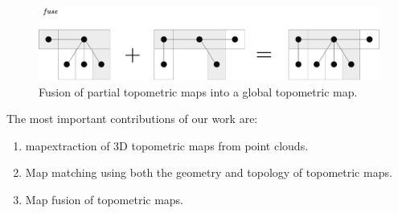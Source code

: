 \begin{figure}[h]
    \centering
    \includegraphics*[width=.9\textwidth]{./fig/overview_diagrams-Page-1.drawio.pdf}
    \caption{Fusion of partial topometric maps into a global topometric map.}
    \label{fig:fuse_intro}
\end{figure}

The most important contributions of our work are:

\begin{enumerate}
    \item \Gls{mapextraction} of 3D topometric maps from point clouds.
    \item Map matching using both the geometry and topology of topometric maps.
    \item Map fusion of topometric maps.
\end{enumerate}
